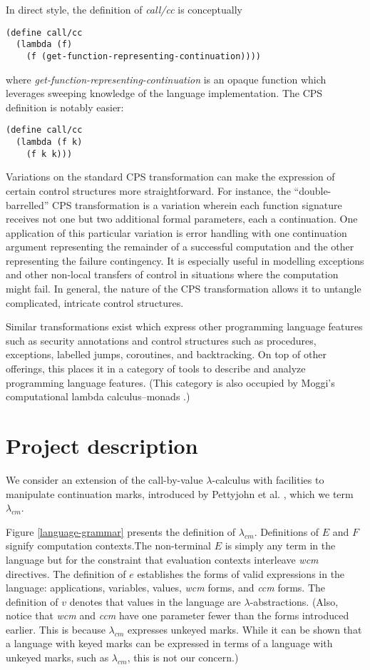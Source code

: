 \documentclass[ms]{byuprop}
\newcounter{definition}
\begin{document}
In direct style, the definition of \emph{call/cc} is conceptually 
\begin{verbatim}
(define call/cc
  (lambda (f)
    (f (get-function-representing-continuation))))
\end{verbatim}
where \emph{get-function-representing-continuation} is an opaque function which 
leverages sweeping knowledge of the language implementation. The CPS definition 
is notably easier:
\begin{verbatim}
(define call/cc
  (lambda (f k)
    (f k k)))
\end{verbatim}

Variations on the standard CPS transformation can make the expression of certain 
control structures more straightforward. For instance, the ``double-barrelled'' 
CPS transformation is a variation wherein each function signature receives not 
one but two additional formal parameters, each a continuation. One application 
of this particular variation is error handling with one continuation argument 
representing the remainder of a successful computation and the other representing 
the failure contingency. It is especially useful in modelling exceptions and 
other non-local transfers of control in situations where the computation might fail.
In general, the nature of the CPS transformation allows it to untangle 
complicated, intricate control structures.

Similar transformations exist which express other programming language features 
such as security annotations \cite{wallach2000safkasi} and control structures 
such as procedures, exceptions, labelled jumps, coroutines, and 
backtracking. On top of other offerings, this places it in a category of tools 
to describe and analyze programming language features. (This category is also 
occupied by Moggi's computational lambda calculus--monads 
\cite{moggi1989computational}.)

\section{Project description}

We consider an extension of the call-by-value $\lambda$-calculus with 
facilities to manipulate continuation marks, introduced by Pettyjohn et al. 
\cite{pettyjohn2005continuations}, which we term $\lambda_{cm}$.

Figure \ref{language-grammar} presents the definition of $\lambda_{cm}$. 
Definitions of $E$ and $F$ signify computation contexts.The non-terminal 
$E$ is simply any term in the language but for the constraint that evaluation 
contexts interleave \emph{wcm} directives. The definition of $e$ establishes 
the forms of valid expressions in the language: applications, variables, 
values, \emph{wcm} forms, and \emph{ccm} forms. The definition of $v$ denotes 
that values in the language are $\lambda$-abstractions. (Also, notice that 
\emph{wcm} and \emph{ccm} have one parameter fewer than the forms introduced 
earlier. This is because $\lambda_{cm}$ expresses unkeyed marks. While it can 
be shown that a language with keyed marks can be expressed in terms of a 
language with unkeyed marks, such as $\lambda_{cm}$, this is not our concern.) 
\end{document}
